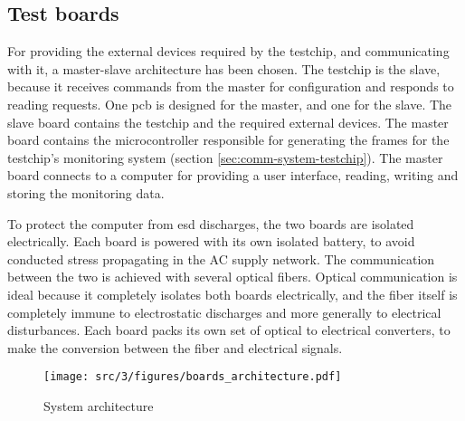 \subsection{Test boards}

For providing the external devices required by the testchip, and communicating with it, a master-slave architecture has been chosen.
The testchip is the slave, because it receives commands from the master for configuration and responds to reading requests.
One \gls{pcb} is designed for the master, and one for the slave.
The slave board contains the testchip and the required external devices.
The master board contains the microcontroller responsible for generating the frames for the testchip's monitoring system (section \ref{sec:comm-system-testchip}).
The master board connects to a computer for providing a user interface, reading, writing and storing the monitoring data.

To protect the computer from \gls{esd} discharges, the two boards are isolated electrically.
Each board is powered with its own isolated battery, to avoid conducted stress propagating in the AC supply network.
The communication between the two is achieved with several optical fibers.
Optical communication is ideal because it completely isolates both boards electrically, and the fiber itself is completely immune to electrostatic discharges and more generally to electrical disturbances.
Each board packs its own set of optical to electrical converters, to make the conversion between the fiber and electrical signals.

\begin{figure}[!h]
  \centering
  \texttt{[image: src/3/figures/boards\_architecture.pdf]}
  \caption{System architecture}
  \label{fig:system-board-architecture}
\end{figure}


